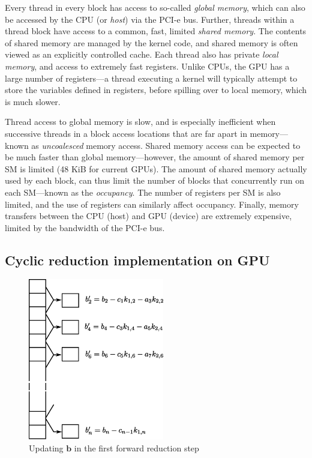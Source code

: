 \documentclass{elsarticle}
\begin{document}
Every thread in every block has access to so-called \emph{global memory},
which can also be accessed by the CPU (or \emph{host}) via the PCI-e bus.
Further,
threads within a thread block have access
to a common, fast, limited \emph{shared memory}.
The contents of shared memory are managed by the kernel code,
and shared memory is often viewed as an explicitly controlled cache.
Each thread also has private \emph{local memory},
and access to extremely fast registers.
Unlike CPUs, the GPU has a large number of registers---a
thread executing a kernel will
typically attempt to store the variables defined in registers,
before spilling over to local memory, which is much slower.

Thread access to global memory is slow,
and is especially inefficient when
successive threads in a block
access locations that are far apart in memory---known
as \emph{uncoalesced} memory access.
Shared memory access can be expected to be
much faster than global memory---however,
the amount of shared memory per SM is limited
(48 KiB for current GPUs).
The amount of shared memory actually used by each block,
can thus limit the number of blocks that
concurrently run on each SM---known as the \emph{occupancy}.
The number of registers per SM is also limited,
and the use of registers can similarly affect occupancy.
Finally, memory transfers between the CPU (host) and GPU (device)
are extremely expensive, limited by the bandwidth of the PCI-e bus.

\subsection{Cyclic reduction implementation on GPU}

\begin{figure}[h!]
\begin{center}
\includegraphics[height=200pt]{img/forward-reduction-step.eps}
\end{center}
\caption{Updating $\bm{b}$ in the first forward reduction step}
\label{fig:forward-reduction-step}
\end{figure}
\end{document}
